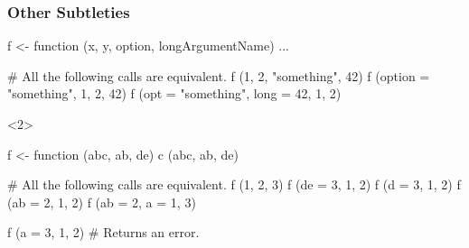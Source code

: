\documentclass{beamer}
\begin{document}
\begin{frame}[fragile]
    \label{frame:other:subtleties}
    \frametitle{Other Subtleties}

\begin{Rcode}
f <- function (x, y, option, longArgumentName) ...

# All the following calls are equivalent.
f (1, 2, "something", 42)
f (option = "something", 1, 2, 42)
f (opt = "something", long = 42, 1, 2)
\end{Rcode}

\begin{overlayarea}{\textwidth}{5cm}
\begin{onlyenv}<2>
\begin{Rcode}
f <- function (abc, ab, de) c (abc, ab, de)

# All the following calls are equivalent.
f (1, 2, 3)
f (de = 3, 1, 2)
f (d = 3, 1, 2)
f (ab = 2, 1, 2)
f (ab = 2, a = 1, 3)

f (a = 3, 1, 2) # Returns an error.
\end{Rcode}
\end{onlyenv}
\end{overlayarea}

\end{frame}

\frame{\questiontoc}
\end{document}
